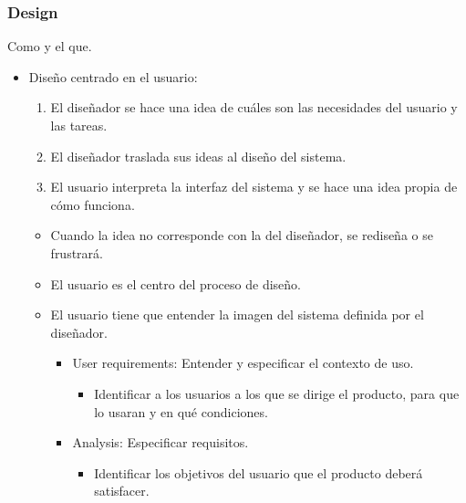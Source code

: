 \documentclass[12pt, twoside, openright]{report} %
\begin{document}
\subsubsection{Design}
Como y el que.

\begin{itemize}
	\item Diseño centrado en el usuario:

	      \begin{enumerate}
		      \def\labelenumi{\arabic{enumi}.}


		      \item El diseñador se hace una idea de cuáles son las necesidades del
		            usuario y las tareas.

		      \item El diseñador traslada sus ideas al diseño del sistema.

		      \item El usuario interpreta la interfaz del sistema y se hace una idea
		            propia de cómo funciona.
	      \end{enumerate}

	      \begin{itemize}
		      \item Cuando la idea no corresponde con la del diseñador, se rediseña
		            o se frustrará.

		      \item El usuario es el centro del proceso de diseño.

		      \item El usuario tiene que entender la imagen del sistema definida por
		            el diseñador.

		            \begin{itemize}
			            \item User requirements: Entender y especificar el contexto de uso.

			                  \begin{itemize}
				                  \item Identificar a los usuarios a los que se dirige el producto,
				                        para que lo usaran y en qué condiciones.
			                  \end{itemize}

			            \item Analysis: Especificar requisitos.

			                  \begin{itemize}
				                  \item Identificar los objetivos del usuario que el producto deberá
				                        satisfacer.


\end{itemize}
\end{itemize}
\end{itemize}
\end{itemize}
\end{document}

